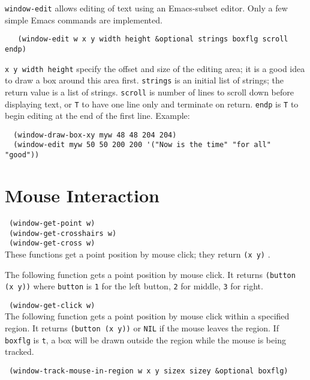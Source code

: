{\tt window-edit} allows editing of text using an Emacs-subset editor.
Only a few simple Emacs commands are implemented.
\begin{verbatim}
   (window-edit w x y width height &optional strings boxflg scroll endp)
\end{verbatim}
{\tt x y width height} specify the offset and size of the editing
area; it is a good idea to draw a box around this area first.
{\tt strings} is an initial list of strings; the return value is a list
of strings.
{\tt scroll} is number of lines to scroll down before displaying text,
          or {\tt T} to have one line only and terminate on return.
{\tt endp} is {\tt T} to begin editing at the end of the first line.
Example:
\begin{verbatim}
  (window-draw-box-xy myw 48 48 204 204)
  (window-edit myw 50 50 200 200 '("Now is the time" "for all" "good"))
\end{verbatim}


\section{Mouse Interaction}

{\tt \hspace*{0.5in} (window-get-point w)} \\
{\tt \hspace*{0.5in} (window-get-crosshairs w)} \\
{\tt \hspace*{0.5in} (window-get-cross w)} \\
These functions  get a point position by mouse click; they return {\tt (x y)} .

The following function gets a point position by mouse click.  It returns
{\tt (button (x y))} where {\tt button} is {\tt 1} for the left button,
{\tt 2} for middle, {\tt 3} for right.

{\tt \hspace*{0.5in} (window-get-click w)} \\

The following function gets a point position by mouse click within a specified
region.  It returns {\tt (button (x y))} or {\tt NIL} if the mouse leaves
the region.  If {\tt boxflg} is {\tt t}, a box will be drawn outside the
region while the mouse is being tracked.

{\tt \hspace*{0.5in} (window-track-mouse-in-region w x y sizex sizey \&optional boxflg)} \\


